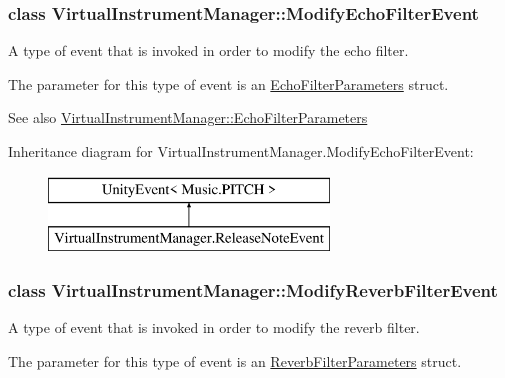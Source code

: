 \subsubsection{class Virtual\+Instrument\+Manager\+:\+:Modify\+Echo\+Filter\+Event}
A type of event that is invoked in order to modify the echo filter. 

The parameter for this type of event is an \hyperlink{group___event_types_struct_virtual_instrument_manager_1_1_echo_filter_parameters}{Echo\+Filter\+Parameters} struct.

\begin{DoxySeeAlso}{See also}
\hyperlink{group___event_types_struct_virtual_instrument_manager_1_1_echo_filter_parameters}{Virtual\+Instrument\+Manager\+::\+Echo\+Filter\+Parameters} 
\end{DoxySeeAlso}
Inheritance diagram for Virtual\+Instrument\+Manager.\+Modify\+Echo\+Filter\+Event\+:\begin{figure}[H]
\begin{center}
\leavevmode
\includegraphics[height=2.000000cm]{group___event_types}
\end{center}
\end{figure}
\label{class_virtual_instrument_manager_1_1_modify_reverb_filter_event}
\subsubsection{class Virtual\+Instrument\+Manager\+:\+:Modify\+Reverb\+Filter\+Event}
A type of event that is invoked in order to modify the reverb filter. 

The parameter for this type of event is an \hyperlink{group___event_types_struct_virtual_instrument_manager_1_1_reverb_filter_parameters}{Reverb\+Filter\+Parameters} struct.

